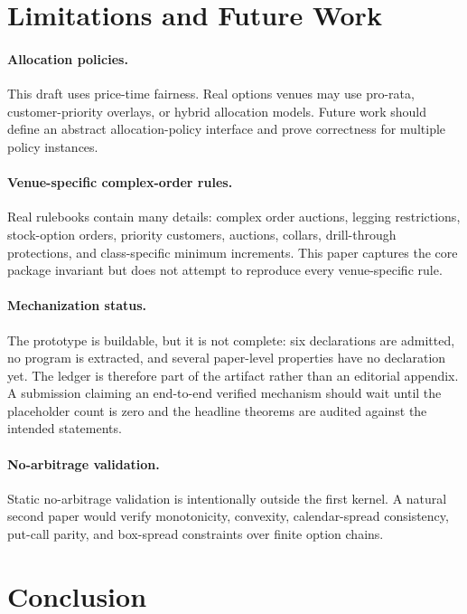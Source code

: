 \documentclass[11pt]{article}
\begin{document}
\section{Limitations and Future Work}

\paragraph{Allocation policies.}
This draft uses price-time fairness. Real options venues may use pro-rata, customer-priority overlays, or hybrid allocation models. Future work should define an abstract allocation-policy interface and prove correctness for multiple policy instances.

\paragraph{Venue-specific complex-order rules.}
Real rulebooks contain many details: complex order auctions, legging restrictions, stock-option orders, priority customers, auctions, collars, drill-through protections, and class-specific minimum increments. This paper captures the core package invariant but does not attempt to reproduce every venue-specific rule.

\paragraph{Mechanization status.}
The prototype is buildable, but it is not complete: six declarations are admitted, no program is extracted, and several paper-level properties have no declaration yet. The ledger is therefore part of the artifact rather than an editorial appendix. A submission claiming an end-to-end verified mechanism should wait until the placeholder count is zero and the headline theorems are audited against the intended statements.

\paragraph{No-arbitrage validation.}
Static no-arbitrage validation is intentionally outside the first kernel. A natural second paper would verify monotonicity, convexity, calendar-spread consistency, put-call parity, and box-spread constraints over finite option chains.

\section{Conclusion}
\end{document}
